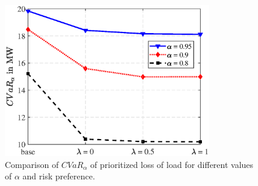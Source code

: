 \begin{figure}[t]
    \centering
    \includegraphics[width=0.8\textwidth]{figures/CVaR_alpha_harden.eps}
    \vspace{-0.6cm}
    \caption{Comparison of $CVaR_\alpha$ of prioritized loss of load for different values of $\alpha$ and risk preference.}
    \label{fig:CVaR_vs_alpha}
\end{figure}

